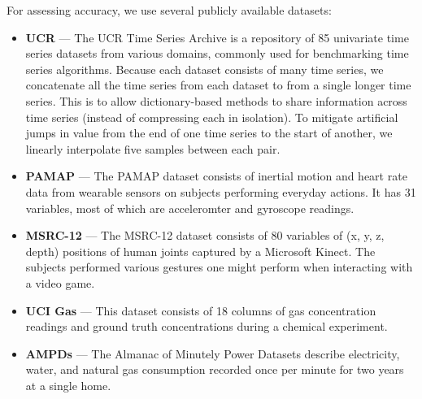 For assessing accuracy, we use several publicly available datasets:
\begin{itemize}[leftmargin=4mm]
\item \textbf{UCR} \cite{ucrTimeSeries} --- The UCR Time Series Archive is a repository of 85 univariate time series datasets from various domains, commonly used for benchmarking time series algorithms. Because each dataset consists of many time series, we concatenate all the time series from each dataset to from a single longer time series. This is to allow dictionary-based methods to share information across time series (instead of compressing each in isolation). To mitigate artificial jumps in value from the end of one time series to the start of another, we linearly interpolate five samples between each pair.
\item \textbf{PAMAP} \cite{pamap} --- The PAMAP dataset consists of inertial motion and heart rate data from wearable sensors on subjects performing everyday actions. It has 31 variables, most of which are acceleromter and gyroscope readings.
\item \textbf{MSRC-12} \cite{msrc} --- The MSRC-12 dataset consists of 80 variables of (x, y, z, depth) positions of human joints captured by a Microsoft Kinect. The subjects performed various gestures one might perform when interacting with a video game.
\item \textbf{UCI Gas} \cite{uci_gas} --- This dataset consists of 18 columns of gas concentration readings and ground truth concentrations during a chemical experiment.
\item \textbf{AMPDs} \cite{ampds} --- The Almanac of Minutely Power Datasets describe electricity, water, and natural gas consumption recorded once per minute for two years at a single home. %
\end{itemize}

